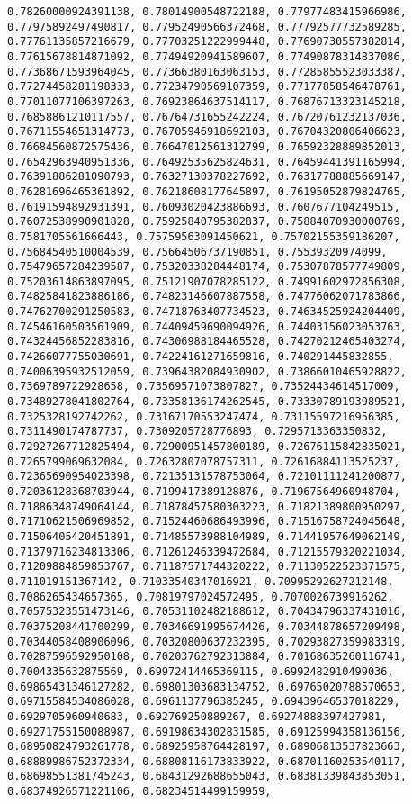 \documentclass[11pt]{article}
\begin{document}
\begin{Verbatim}[commandchars=\\\{\}]
0.78260000924391138, 0.78014900548722188, 0.77977483415966986, 0.77975892497490817, 0.77952490566372468, 0.77792577732589285, 0.77761135857216679, 0.77703251222999448, 0.77690730557382814, 0.77615678814871092, 0.77494920941589607, 0.77490878314837086, 0.77368671593964045, 0.77366380163063153, 0.77285855523033387, 0.77274458281198333, 0.77234790569107359, 0.77177858546478761, 0.77011077106397263, 0.76923864637514117, 0.76876713323145218, 0.76858861210117557, 0.76764731655242224, 0.76720761232137036, 0.76711554651314773, 0.76705946918692103, 0.76704320806406623, 0.76684560872575436, 0.76647012561312799, 0.76592328889852013, 0.76542963940951336, 0.76492535625824631, 0.76459441391165994, 0.76391886281090793, 0.76327130378227692, 0.76317788885669147, 0.76281696465361892, 0.76218608177645897, 0.76195052879824765, 0.76191594892931391, 0.76093020423886693, 0.7607677104249515, 0.76072538990901828, 0.75925840795382837, 0.75884070930000769, 0.7581705561666443, 0.75759563091450621, 0.75702155359186207, 0.75684540510004539, 0.75664506737190851, 0.75539320974099, 0.75479657284239587, 0.75320338284448174, 0.75307878577749809, 0.75203614863897095, 0.75121907078285122, 0.74991602972856308, 0.74825841823886186, 0.74823146607887558, 0.74776062071783866, 0.74762700291250583, 0.74718763407734523, 0.74634525924204409, 0.74546160503561909, 0.74409459690094926, 0.74403156023053763, 0.74324456852283816, 0.74306988184465528, 0.74270212465403274, 0.74266077755030691, 0.74224161271659816, 0.740291445832855, 0.74006395932512059, 0.73964382084930902, 0.73866010465928822, 0.7369789722928658, 0.73569571073807827, 0.73524434614517009, 0.73489278041802764, 0.73358136174262545, 0.73330789193989521, 0.7325328192742262, 0.73167170553247474, 0.73115597216956385, 0.7311490174787737, 0.7309205728776893, 0.7295713363350832, 0.72927267712825494, 0.72900951457800189, 0.72676115842835021, 0.7265799069632084, 0.72632807078757311, 0.72616884113525237, 0.72365690954023398, 0.72135131578753064, 0.72101111241200877, 0.72036128368703944, 0.7199417389128876, 0.71967564960948704, 0.71886348749064144, 0.71878457580303223, 0.71821389800950297, 0.71710621506969852, 0.71524460686493996, 0.71516758724045648, 0.71506405420451891, 0.71485573988104989, 0.71441957649062149, 0.71379716234813306, 0.71261246339472684, 0.71215579320221034, 0.71209884859853767, 0.71187571744320222, 0.71130522523371575, 0.711019151367142, 0.71033540347016921, 0.70995292627212148, 0.7086265434657365, 0.70819797024572495, 0.7070026739916262, 0.70575323551473146, 0.70531102482188612, 0.70434796337431016, 0.70375208441700299, 0.70346691995674426, 0.70344878657209498, 0.70344058408906096, 0.70320800637232395, 0.70293827359983319, 0.70287596592950108, 0.70203762792313884, 0.70168635260116741, 0.7004335632875569, 0.69972414465369115, 0.6992482910499036, 0.69865431346127282, 0.69801303683134752, 0.69765020788570653, 0.69715584534086028, 0.6961137796385245, 0.69439646537018229, 0.6929705960940683, 0.692769250889267, 0.69274888397427981, 0.69271755150088987, 0.69198634302831585, 0.69125994358136156, 0.68950824793261778, 0.68925958764428197, 0.68906813537823663, 0.68889986752372334, 0.68808116173833922, 0.68701160253540117, 0.68698551381745243, 0.68431292688655043, 0.68381339843853051, 0.68374926571221106, 0.68234514499159959, 
\end{Verbatim}
\end{document}
